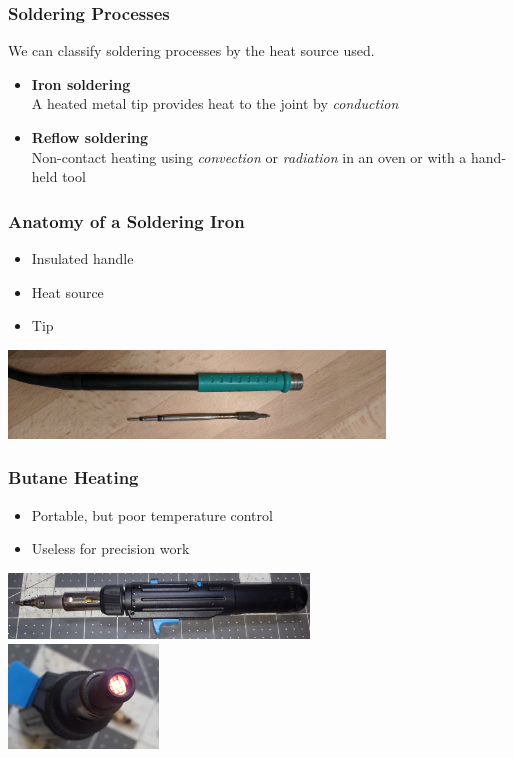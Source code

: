 \documentclass{beamer}
\begin{document}
\begin{frame}
\frametitle{Soldering Processes}
We can classify soldering processes by the heat source used.
\begin{itemize}
\item \textbf{Iron soldering} \\
A heated metal tip provides heat to the joint by \emph{conduction}
\item \textbf{Reflow soldering} \\
Non-contact heating using \emph{convection} or \emph{radiation} in an oven or with a hand-held tool
\end{itemize}
\end{frame}

\begin{frame}
\frametitle{Anatomy of a Soldering Iron}
\begin{itemize}
\item Insulated handle
\item Heat source
\item Tip
\end{itemize}
\begin{center}
\includegraphics[width=10cm,keepaspectratio]{anatomy.jpg}
\end{center}
\end{frame}

\begin{frame}
\frametitle{Butane Heating}
\begin{itemize}
\item Portable, but poor temperature control
\item Useless for precision work
\end{itemize}
\begin{center}
\includegraphics[width=8cm,keepaspectratio]{butane-1.jpg} \\
\includegraphics[width=4cm,keepaspectratio]{butane-2.jpg} \\
\end{center}
\end{frame}
\end{document}
